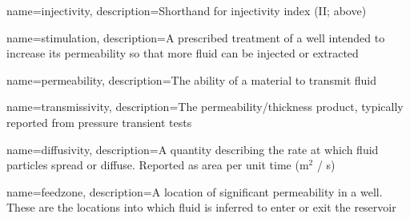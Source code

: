 {
    name=injectivity,
    description={Shorthand for injectivity index (II; above)}
}

{
    name=stimulation,
    description={A prescribed treatment of a well intended to increase its permeability so that more fluid can be injected or extracted}
}

{
    name=permeability,
    description={The ability of a material to transmit fluid}
}

{
    name=transmissivity,
    description={The permeability\slash{thickness} product, typically reported from pressure transient tests}
}

{
    name=diffusivity,
    description={A quantity describing the rate at which fluid particles spread or diffuse. Reported as area per unit time (m$^{2}$ / s)}
}

{
    name=feedzone,
    description={A location of significant permeability in a well. These are the locations into which fluid is inferred to enter or exit the reservoir}
}

